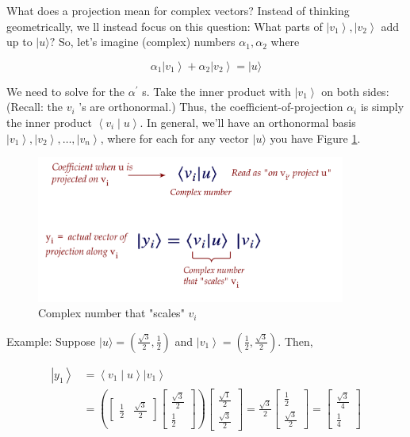 \documentclass[main.tex]{subfiles}
\begin{document}
    What does a projection mean for complex vectors? Instead of thinking geometrically, we ll instead focus on this question: What parts of $\left|v_{1}\right\rangle,\left|v_{2}\right\rangle$ add up to $|u\rangle ?$ So, let's imagine (complex) numbers $\alpha_{1}, \alpha_{2}$ where

    $$
    \alpha_{1}\left|v_{1}\right\rangle+\alpha_{2}\left|v_{2}\right\rangle=|u\rangle
    $$

    We need to solve for the $\alpha^{\prime}$ s. Take the inner product with $\left|v_{1}\right\rangle$ on both sides: (Recall: the $v_{i}$ 's are orthonormal.) Thus, the coefficient-of-projection $\alpha_{i}$ is simply the inner product $\left\langle v_{i} \mid u\right\rangle$. In general, we'll have an orthonormal basis $\left|v_{1}\right\rangle,\left|v_{2}\right\rangle, \ldots,\left|v_{n}\right\rangle$, where for each for any vector $|u\rangle$ you have Figure \ref{fig:13projection2}.
    
    \begin{figure}
        \centering
        \includegraphics[width=4in]{notes/figs/n04/13projection2.png}
        \caption{Complex number that "scales" $v_i$}
        \label{fig:13projection2}
    \end{figure}
    
    Example: Suppose $|u\rangle=\left(\frac{\sqrt{3}}{2}, \frac{1}{2}\right)$ and $\left|v_{1}\right\rangle=\left(\frac{1}{2}, \frac{\sqrt{3}}{2}\right)$. Then,
    
    $$
    \begin{aligned}
    \left|y_{1}\right\rangle &=\left\langle v_{1} \mid u\right\rangle\left|v_{1}\right\rangle \\
    &=\left(\left[\begin{array}{cc}
    \frac{1}{2} & \frac{\sqrt{3}}{2}
    \end{array}\right]\left[\begin{array}{c}
    \frac{\sqrt{3}}{2} \\
    \frac{1}{2}
    \end{array}\right]\right)\left[\begin{array}{c}
    \frac{\sqrt{1}}{2} \\
    \frac{\sqrt{3}}{2}
    \end{array}\right]=\frac{\sqrt{3}}{2}\left[\begin{array}{c}
    \frac{1}{2} \\
    \frac{\sqrt{3}}{2}
    \end{array}\right]=\left[\begin{array}{c}
    \frac{\sqrt{3}}{4} \\
    \frac{1}{4}
    \end{array}\right]
    \end{aligned}
    $$
    
\end{document}
